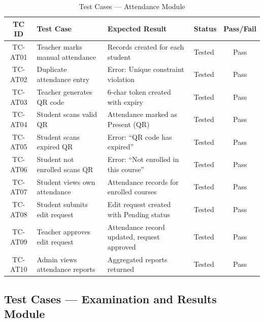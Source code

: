 \begin{table}[H]
\centering
\caption{Test Cases --- Attendance Module}
\label{tab:test_attendance}
\footnotesize
\begin{tabular}{|c|p{4cm}|p{4cm}|p{2cm}|c|}
\hline
\textbf{TC ID} & \textbf{Test Case} & \textbf{Expected Result} & \textbf{Status} & \textbf{Pass/Fail} \\
\hline
TC-AT01 & Teacher marks manual attendance & Records created for each student & Tested & Pass \\
\hline
TC-AT02 & Duplicate attendance entry & Error: Unique constraint violation & Tested & Pass \\
\hline
TC-AT03 & Teacher generates QR code & 6-char token created with expiry & Tested & Pass \\
\hline
TC-AT04 & Student scans valid QR & Attendance marked as Present (QR) & Tested & Pass \\
\hline
TC-AT05 & Student scans expired QR & Error: ``QR code has expired'' & Tested & Pass \\
\hline
TC-AT06 & Student not enrolled scans QR & Error: ``Not enrolled in this course'' & Tested & Pass \\
\hline
TC-AT07 & Student views own attendance & Attendance records for enrolled courses & Tested & Pass \\
\hline
TC-AT08 & Student submits edit request & Edit request created with Pending status & Tested & Pass \\
\hline
TC-AT09 & Teacher approves edit request & Attendance record updated, request approved & Tested & Pass \\
\hline
TC-AT10 & Admin views attendance reports & Aggregated reports returned & Tested & Pass \\
\hline
\end{tabular}
\end{table}

\subsection{Test Cases --- Examination and Results Module}

